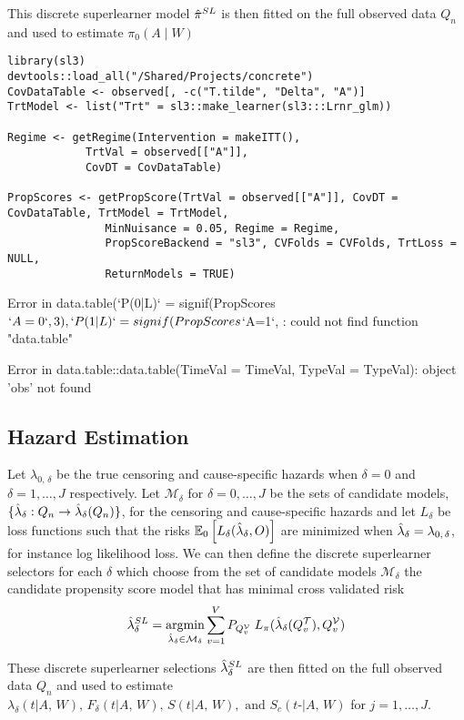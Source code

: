 \documentclass{report}
\DeclareMathOperator*{\argmin}{argmin}
\newcommand{\1}{\ensuremath{\mathbf{1}}}
\newcommand{\X}{\ensuremath{{W}}}
\newcommand{\AX}{\ensuremath{\mid A,\,{W}}}
\newcommand{\g}{\ensuremath{\pi}}
\begin{document}
This discrete superlearner model \(\Hat{\g}^{SL}\) is then fitted on the full observed data \(Q_n\) and used to estimate \(\g_0(A \mid \X)\)


\begin{lstlisting}
library(sl3)
devtools::load_all("/Shared/Projects/concrete")
CovDataTable <- observed[, -c("T.tilde", "Delta", "A")]
TrtModel <- list("Trt" = sl3::make_learner(sl3:::Lrnr_glm))

Regime <- getRegime(Intervention = makeITT(),
		    TrtVal = observed[["A"]],
		    CovDT = CovDataTable)

PropScores <- getPropScore(TrtVal = observed[["A"]], CovDT = CovDataTable, TrtModel = TrtModel,
			   MinNuisance = 0.05, Regime = Regime,
			   PropScoreBackend = "sl3", CVFolds = CVFolds, TrtLoss = NULL, 
			   ReturnModels = TRUE)
\end{lstlisting}


Error in data.table(`P(0|L)` = signif(PropScores\(`A=0`, 3), `P(1|L)` = signif(PropScores\)`A=1`,  : 
  could not find function "data.table"

Error in data.table::data.table(TimeVal = TimeVal, TypeVal = TypeVal): object 'obs' not found

\subsection{Hazard Estimation}
\label{sec:org2fddb6d}
Let \(\lambda_{0,\,\delta}\) be the true censoring and cause-specific hazards when \(\delta = 0\) and \(\delta = 1, \dots, J\) respectively. Let \(\mathcal{M}_\delta\) for \(\delta = 0, \dots, J\) be the sets of candidate models, \(\{\Hat{\lambda}_\delta : Q_n \to \Hat{\lambda}_\delta(Q_n)\}\), for the censoring and cause-specific hazards and let \(L_\delta\) be loss functions such that the risks \(\mathbb{E}_0\left[L_\delta(\Hat{\lambda}_\delta, O)\right]\) are minimized when \(\Hat{\lambda}_\delta = \lambda_{0,\,\delta}\), for instance log likelihood loss. We can then define the discrete superlearner selectors for each \(\delta\) which choose from the set of candidate models \(\mathcal{M_\delta}\) the candidate propensity score model that has minimal cross validated risk 
\[ \Hat{\lambda}_\delta^{SL} = \argmin_{\Hat{\lambda}_\delta \in \mathcal{M}_\delta} \sum_{v = 1}^{V} P_{Q^\mathcal{V}_v} \; L_\g(\Hat{\lambda}_\delta(Q^\mathcal{T}_v), Q^\mathcal{V}_v)\]

These discrete superlearner selections \(\Hat{\lambda}_\delta^{SL}\) are then fitted on the full observed data \(Q_n\) and used to estimate \(\lambda_\delta(t \AX), \, F_\delta(t \AX),\, S(t \AX), \text{ and } S_c(t\text{-} \AX)\) for \(j = 1,\dots, J\).
\end{document}
